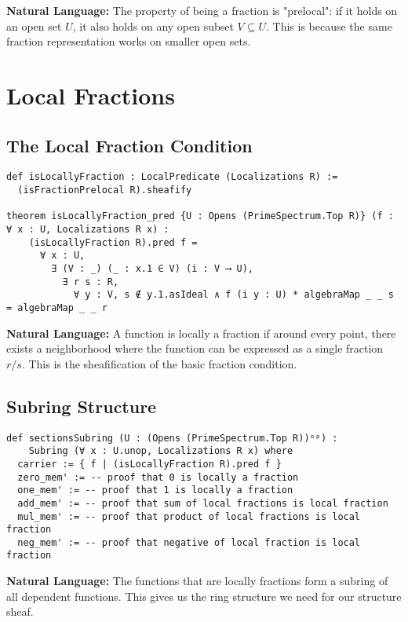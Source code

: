 \documentclass{article}
\theoremstyle{definition}
\begin{document}
\textbf{Natural Language:} The property of being a fraction is "prelocal": if it holds on an open set $U$, it also holds on any open subset $V \subseteq U$. This is because the same fraction representation works on smaller open sets.

\section{Local Fractions}

\subsection{The Local Fraction Condition}

\begin{lstlisting}
def isLocallyFraction : LocalPredicate (Localizations R) :=
  (isFractionPrelocal R).sheafify

theorem isLocallyFraction_pred {U : Opens (PrimeSpectrum.Top R)} (f : ∀ x : U, Localizations R x) :
    (isLocallyFraction R).pred f =
      ∀ x : U,
        ∃ (V : _) (_ : x.1 ∈ V) (i : V ⟶ U),
          ∃ r s : R,
            ∀ y : V, s ∉ y.1.asIdeal ∧ f (i y : U) * algebraMap _ _ s = algebraMap _ _ r
\end{lstlisting}

\textbf{Natural Language:} A function is locally a fraction if around every point, there exists a neighborhood where the function can be expressed as a single fraction $r/s$. This is the sheafification of the basic fraction condition.

\subsection{Subring Structure}

\begin{lstlisting}
def sectionsSubring (U : (Opens (PrimeSpectrum.Top R))ᵒᵖ) :
    Subring (∀ x : U.unop, Localizations R x) where
  carrier := { f | (isLocallyFraction R).pred f }
  zero_mem' := -- proof that 0 is locally a fraction
  one_mem' := -- proof that 1 is locally a fraction
  add_mem' := -- proof that sum of local fractions is local fraction
  mul_mem' := -- proof that product of local fractions is local fraction
  neg_mem' := -- proof that negative of local fraction is local fraction
\end{lstlisting}

\textbf{Natural Language:} The functions that are locally fractions form a subring of all dependent functions. This gives us the ring structure we need for our structure sheaf.
\end{document}
